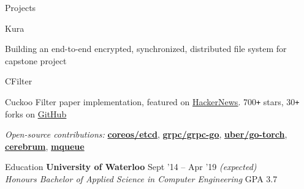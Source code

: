 \documentclass{resume} %
\begin{document}
\begin{rSection}{Projects}
  \begin{rProjectSection}{Kura}
                         {}
       \item Building an end-to-end encrypted, synchronized, distributed file
         system for capstone project
  \end{rProjectSection}

  \begin{rProjectSection}{CFilter}
                         {}
       \item Cuckoo Filter paper implementation, featured on
         \href{https://news.ycombinator.com/item?id=12241332}{\underline
         {HackerNews}}. 700\texttt{+} stars, 30\texttt{+} forks on
         \href{https://git.io/v6GkV}{\underline {GitHub}}
  \end{rProjectSection}

  \begin{rBlurbSection}
    \item {\em Open-source contributions:}
      \href{https://github.com/coreos/etcd/pull/8288}{\textbf{coreos/etcd}},
      \href{https://github.com/grpc/grpc-go/pull/1478}{\textbf{grpc/grpc-go}},
      \href{https://github.com/uber/go-torch/pull/62}{\textbf{uber/go-torch}},
      \href{https://rubygems.org/gems/cerebrum}{\textbf{cerebrum}},
      \href{https://rubygems.org/gems/mqueue}{\textbf{mqueue}}
  \end{rBlurbSection}
\end{rSection}


\begin{rSection}{Education}
  {\bf University of Waterloo} \hfill {Sept '14 -- Apr '19 \em (expected)} \\
  {\em Honours Bachelor of Applied Science in Computer Engineering} \hfill {GPA 3.7}
  \vspace{0.5em}
\end{rSection}
\end{document}
